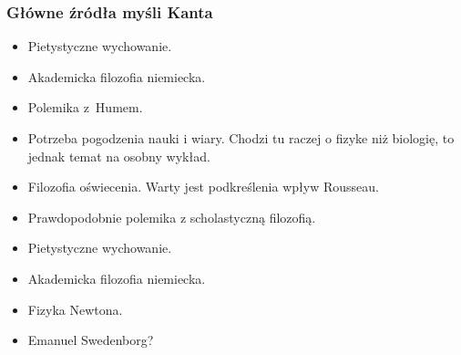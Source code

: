 \documentclass[10pt,t]{beamer}
\begin{document}
\begin{frame}
  \frametitle{Główne źródła myśli Kanta}


  \begin{itemize}
    \RaggedRight

  \item Pietystyczne wychowanie.

  \item Akademicka filozofia niemiecka.

  \item Polemika z~Humem.

  \item Potrzeba pogodzenia nauki i wiary. Chodzi tu raczej o fizyke
    niż biologię, to jednak temat na osobny wykład.

  \item Filozofia oświecenia. Warty jest podkreślenia wpływ
    Rousseau.

  \item Prawdopodobnie polemika z scholastyczną filozofią.

  \item Pietystyczne wychowanie.

  \item Akademicka filozofia niemiecka.

  \item Fizyka Newtona.

  \item Emanuel Swedenborg?

  \end{itemize}

\end{frame}
\end{document}

